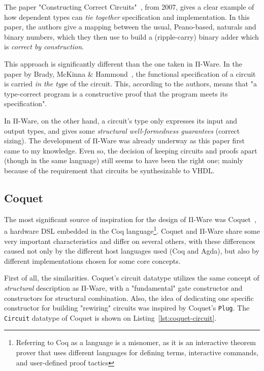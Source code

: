         The paper "Constructing Correct Circuits"~\cite{brady-constructing}, from 2007,
        gives a clear example of how dependent types can \emph{tie together} specification and implementation.
        In this paper, the authors give a mapping between the usual, Peano-based, naturals and binary numbers,
        which they then use to build a (ripple-carry) binary adder which is \emph{correct by construction}.

        This approach is significantly different than the one taken in Π-Ware.
        In the paper by Brady, McKinna \& Hammond~\cite{brady-constructing},
        the functional specification of a circuit is carried \emph{in the type} of the circuit.
        This, according to the authors, means that
        "a type-correct program is a constructive proof that the program meets its specification".

        In Π-Ware, on the other hand, a circuit's type only expresses its input and output types,
        and gives some \emph{structural well-formedness guarantees} (correct sizing).
        The development of Π-Ware was already underway as this paper first came to my knowledge.
        Even so, the decision of keeping circuits and proofs apart (though in the same language)
        still seems to have been the right one; mainly because of the requirement that circuits
        be synthesizable to \ac{VHDL}.

        \subsection{Coquet}
        \label{subsec:coquet}
            The most significant source of inspiration for the design of Π-Ware was
            Coquet~\cite{coquet2011}, a hardware \ac{DSL} embedded in the Coq
            language\footnote{Referring to Coq as a language is a misnomer, as it is
                an interactive theorem prover that uses different languages for defining terms,
                interactive commands, and user-defined proof tactics}.
            Coquet and Π-Ware share some very important characteristics and differ on several others,
            with these differences caused not only by the different host languages used (Coq and Agda),
            but also by different implementations chosen for some core concepts.

            First of all, the similarities.
            Coquet's circuit datatype utilizes the same concept of \emph{structural} description
            as Π-Ware, with a "fundamental" gate constructor and constructors for structural combination.
            Also, the idea of dedicating one specific constructor for building "rewiring" circuits
            was inspired by Coquet's \texttt{Plug}.
            The \texttt{Circuit} datatype of Coquet is shown on Listing~\ref{lst:coquet-circuit}.

